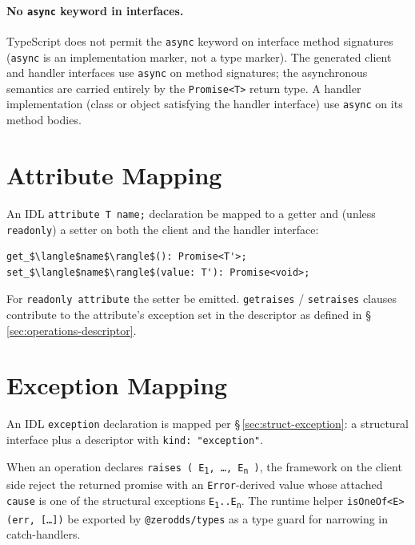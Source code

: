 \documentclass{../styles/zerodds-vendor-spec}
\begin{document}
\paragraph{No \texttt{async} keyword in interfaces.} TypeScript
does not permit the \texttt{async} keyword on interface method
signatures (\texttt{async} is an implementation marker, not a
type marker). The generated client and handler interfaces
 use \texttt{async} on method signatures; the
asynchronous semantics are carried entirely by the
\texttt{Promise<T>} return type. A handler implementation
(class or object satisfying the handler interface) 
use \texttt{async} on its method bodies.

\section{Attribute Mapping}\label{sec:operations-attributes}

An IDL \texttt{attribute T name;} declaration  be
mapped to a getter and (unless \texttt{readonly}) a setter on
both the client and the handler interface:

\begin{lstlisting}
get_$\langle$name$\rangle$(): Promise<T'>;
set_$\langle$name$\rangle$(value: T'): Promise<void>;
\end{lstlisting}

For \texttt{readonly attribute} the setter  be
emitted. \texttt{getraises} / \texttt{setraises} clauses
contribute to the attribute's exception set in the descriptor as
defined in \S\,\ref{sec:operations-descriptor}.

\section{Exception Mapping}\label{sec:operations-exceptions}

An IDL \texttt{exception} declaration is mapped per
\S\,\ref{sec:struct-exception}: a structural interface plus a
descriptor with \texttt{kind:\,"exception"}.

When an operation declares
\texttt{raises\,(\,E\textsubscript{1},\,\ldots,\,E\textsubscript{n}\,)},
the framework on the client side  reject the returned
promise with an \texttt{Error}-derived value whose attached
\texttt{cause} is one of the structural exceptions
\texttt{E\textsubscript{1}..E\textsubscript{n}}. The runtime
helper \texttt{isOneOf<E>(err, [\ldots])}  be
exported by \texttt{@zerodds/types} as a type guard for
narrowing in catch-handlers.
\end{document}
